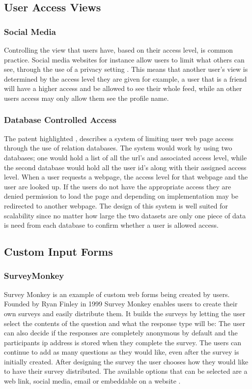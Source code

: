 \documentclass[12pt]{article}  %
\begin{document}
\subsection{User Access Views}

\subsubsection{Social Media}
Controlling the view that users have, based on their access level, is common practice. Social media websites for instance allow users to limit what others  can see, through the use of a privacy setting \cite{tufekci_can_2008}. This means that another user's view is determined by the access level they are given for example, a user that is a friend will have a higher access and be allowed to see their whole feed, while an other users access may only allow them see the profile name.

\subsubsection{Database Controlled Access}
The patent highlighted \cite{noauthor_system_1997}, describes a system of limiting user web page access through the use of relation databases. The system would work by using two databases; one would hold a list of all the url's and associated access level, while the second database would hold all the user id's along with their assigned access level. When a user requests a webpage, the access level for that webpage and the user are looked up. If the users do not have the appropriate access they are denied permission to load the page and depending on implementation may be redirected to another webpage.
The design of this system is well suited for scalability since no matter how large the two datasets are only one piece of data is need from each database to confirm whether a user is allowed access.


\subsection{Custom Input Forms}

\subsubsection{SurveyMonkey}
Survey Monkey \cite{finley_surveymonkey_1999} is an example of custom web forms being created by users. Founded by Ryan Finley in 1999 Survey Monkey enables users to create their own surveys and easily distribute them. It builds the surveys by letting the user select the contents of the question and what the response type will be: The user can also decide if the responses are completely anonymous by default and the participants ip address is stored when they complete the survey. The users can continue to add as many questions as they would like, even after the survey is initially created. After designing the survey the user chooses how they would like to have their survey distributed. The available options that can be selected are a web link, social media, email or embeddable on a website \cite{waclawski_how_2012} .
\end{document}
